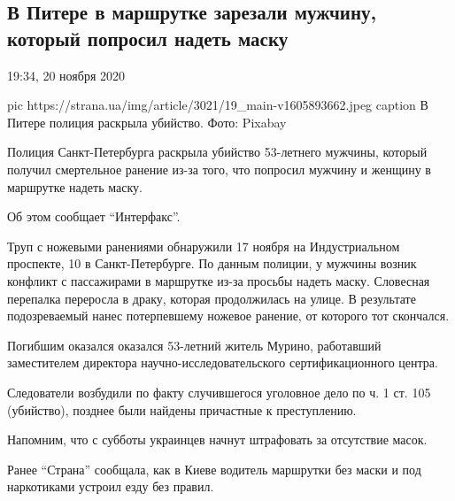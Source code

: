  
 
 
 
 

\subsection{В Питере в маршрутке зарезали мужчину, который попросил надеть маску}

\label{sec:20_11_2020.news.ua.strana.2.piter_parshrutka_maska}

19:34, 20 ноября 2020 

\ifcmt
pic https://strana.ua/img/article/3021/19_main-v1605893662.jpeg
caption В Питере полиция раскрыла убийство. Фото: Pixabay 
\fi

Полиция Санкт-Петербурга раскрыла убийство 53-летнего мужчины, который получил
смертельное ранение из-за того, что попросил мужчину и женщину в маршрутке
надеть маску.

Об этом сообщает \enquote{Интерфакс}.

Труп с ножевыми ранениями обнаружили 17 ноября на Индустриальном проспекте, 10
в Санкт-Петербурге. По данным полиции, у мужчины возник конфликт с пассажирами
в маршрутке из-за просьбы надеть маску. Словесная перепалка переросла в драку,
которая продолжилась на улице. В результате подозреваемый нанес потерпевшему
ножевое ранение, от которого тот скончался.

Погибшим оказался оказался 53-летний житель Мурино, работавший заместителем
директора научно-исследовательского сертификационного центра.

Следователи возбудили по факту случившегося уголовное дело по ч. 1 ст. 105
(убийство), позднее были найдены причастные к преступлению.

Напомним, что с субботы украинцев начнут штрафовать за отсутствие масок.

Ранее \enquote{Страна} сообщала, как в Киеве водитель маршрутки без маски и под
наркотиками устроил езду без правил.
